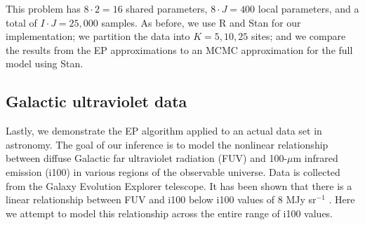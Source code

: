 This problem has $8 \cdot 2 = 16$ shared parameters, $8 \cdot J = 400$ local parameters, and a total of $I \cdot J = 25,000$ samples. As before, we use R and Stan for our implementation; we partition the data into $K = 5, 10, 25$ sites; and we compare the results from the EP approximations to an MCMC approximation for the full model using Stan.

\subsection{Galactic ultraviolet data}
\label{subsec:ep_application_astro}

Lastly, we demonstrate the EP algorithm applied to an actual data set in astronomy. The goal of our inference is to model the nonlinear relationship between diffuse Galactic far ultraviolet radiation (FUV) and 100-$\mu$m infrared emission (i100) in various regions of the observable universe. Data is collected from the Galaxy Evolution Explorer telescope. It has been shown that there is a linear relationship between FUV and i100 below i100 values of 8 MJy sr$^{-1}$ \citep{Hamden+others:2013}.  Here we attempt to model this relationship across the entire range of i100 values.

